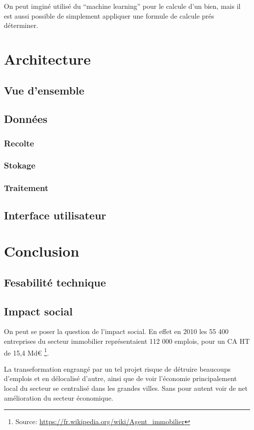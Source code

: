 \documentclass[12pt]{report}
\begin{document}
On peut imginé utilisé du ``machine learning'' pour le calcule d'un bien, mais
il est aussi possible de simplement appliquer une formule de calcule prés
déterminer.

\chapter{Architecture}
\section{Vue d'ensemble}
\section{Données}
\subsection{Recolte}
\subsection{Stokage}
\subsection{Traitement}
\section{Interface utilisateur}

\chapter{Conclusion}
\section{Fesabilité technique}

\section{Impact social}
On peut se poser la question de l'impact social.
En effet en 2010 les 55 400 entreprises du secteur immobilier représentaient
112 000 emplois, pour un CA HT de 15,4 Md€
\footnote{Source: \url{https://fr.wikipedia.org/wiki/Agent_immobilier}}.

La transeformation engrangé par un tel projet risque de détruire beaucoups
d'emplois et en délocalisé d'autre, ainsi que de voir l'économie principalement
local du secteur se centralisé dans les grandes villes. Sans pour autent voir de
net amélioration du secteur économique. 
\end{document}
